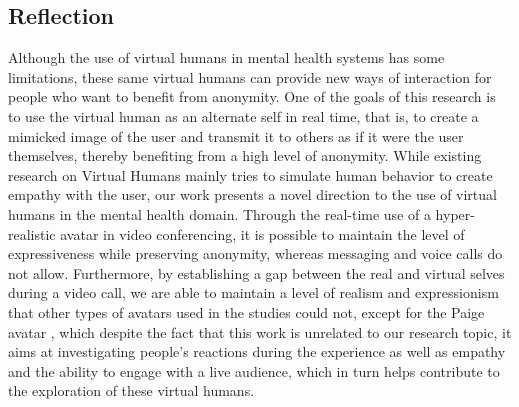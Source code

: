 \subsection{Reflection}
Although the use of virtual humans in mental health systems has some limitations, these same virtual humans can provide new ways of interaction for people who want to benefit from anonymity. One of the goals of this research is to use the virtual human as an alternate self in real time, that is, to create a mimicked image of the user and transmit it to others as if it were the user themselves, thereby benefiting from a high level of anonymity. While existing research on Virtual Humans mainly tries to simulate human behavior to create empathy with the user, our work presents a novel direction to the use of virtual humans in the mental health domain. Through the real-time use of a hyper-realistic avatar in video conferencing, it is possible to maintain the level of expressiveness while preserving anonymity, whereas messaging and voice calls do not allow. Furthermore, by establishing a gap between the real and virtual selves during a video call, we are able to maintain a level of realism and expressionism that other types of avatars used in the studies could not, except for the Paige avatar \cite{ZEL19}, which despite the fact that this work is unrelated to our research topic, it aims at investigating people's reactions during the experience as well as empathy and the ability to engage with a live audience, which in turn helps contribute to the exploration of these virtual humans.